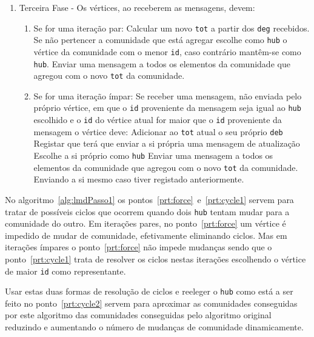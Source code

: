 \begin{algorithm}
\begin{minipage}{\textwidth}
\begin{enumerate}
  \item Terceira Fase - Os vértices, ao receberem as mensagens, devem:
\begin{enumerate}
		\item Se for uma iteração par:
				\subitem Calcular um novo \verb|tot| a partir dos \verb|deg| recebidos.
				\label{prt:cycle2}
				\subitem Se não pertencer a comunidade que está agregar escolhe como \verb|hub| o vértice da comunidade com o menor \verb|id|, caso contrário mantêm-se como \verb|hub|.
				\subitem Enviar uma mensagem a todos os elementos da comunidade que agregou com o novo \verb|tot| da comunidade.
		\item Se for uma iteração ímpar:
		\label{prt:cycle1}
		\subitem Se receber uma mensagem, não enviada pelo próprio vértice, em que o \verb|id| proveniente da mensagem seja igual ao \verb|hub| escolhido e o \verb|id| do vértice atual for maior que o \verb|id| proveniente da mensagem o vértice deve:
				\subsubitem Adicionar ao \verb|tot| atual o seu próprio \verb|deb|
				\subsubitem Registar que terá que enviar a si própria uma mensagem de atualização
				\subsubitem Escolhe a si próprio como \verb|hub|
		\subitem Enviar uma mensagem a todos os elementos da comunidade que agregou com o novo \verb|tot| da comunidade. Enviando a si mesmo caso tiver registado anteriormente.
\end{enumerate}
\end{enumerate}

	\end{minipage}
\end{algorithm}

No algoritmo~\ref{alg:lmdPasso1} os pontos~\ref{prt:force}~e~\ref{prt:cycle1} servem para tratar de possíveis ciclos que ocorrem quando dois \verb|hub| tentam mudar para a comunidade do outro.
Em iterações pares, no ponto~\ref{prt:force} um vértice é impedido de mudar de comunidade, efetivamente eliminando ciclos.
Mas em iterações ímpares o ponto~\ref{prt:force} não impede mudanças sendo que o ponto~\ref{prt:cycle1} trata de resolver os ciclos nestas iterações escolhendo o vértice de maior \verb|id| como representante.

Usar estas duas formas de resolução de ciclos e reeleger o \verb|hub| como está a ser feito no ponto~\ref{prt:cycle2} servem para aproximar as comunidades conseguidas por este algoritmo das comunidades conseguidas pelo algoritmo original reduzindo e aumentando o número de mudanças de comunidade dinamicamente.

